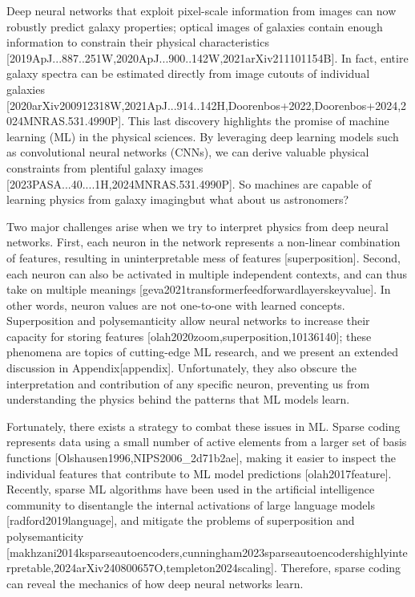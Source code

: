 \documentclass[11pt,a4paper]{article}
\begin{document}
Deep neural networks that exploit pixel-scale information from images can now robustly predict galaxy properties; optical images of galaxies contain enough information to constrain their physical characteristics [2019ApJ...887..251W,2020ApJ...900..142W,2021arXiv211101154B]. In fact, entire galaxy spectra can be estimated directly from image cutouts of individual galaxies [2020arXiv200912318W,2021ApJ...914..142H,Doorenbos+2022,Doorenbos+2024,2024MNRAS.531.4990P]. This last discovery highlights the promise of machine learning (ML) in the physical sciences. By leveraging deep learning models such as convolutional neural networks (CNNs), we can derive valuable physical constraints from plentiful galaxy images [2023PASA...40....1H,2024MNRAS.531.4990P].
So machines are capable of learning physics from galaxy imagingbut what about us astronomers?

Two major challenges arise when we try to interpret physics from deep neural networks. First, each neuron in the network represents a non-linear combination of features, resulting in uninterpretable mess of features [superposition]. Second, each neuron can also be activated in multiple independent contexts, and can thus take on multiple meanings [geva2021transformerfeedforwardlayerskeyvalue]. In other words, neuron values are not one-to-one with learned concepts. Superposition and polysemanticity allow neural networks to increase their capacity for storing features [olah2020zoom,superposition,10136140]; these phenomena are topics of cutting-edge ML research, and we present an extended discussion in Appendix[appendix]. Unfortunately, they also obscure the interpretation and contribution of any specific neuron, preventing us from understanding the physics behind the patterns that ML models learn.

Fortunately, there exists a strategy to combat these issues in ML. Sparse coding represents data using a small number of active elements from a larger set of basis functions [Olshausen1996,NIPS2006\_2d71b2ae], making it easier to inspect the individual features that contribute to ML model predictions [olah2017feature]. Recently, sparse ML algorithms have been used in the artificial intelligence community to disentangle the internal activations of large language models [radford2019language], and mitigate the problems of superposition and polysemanticity [makhzani2014ksparseautoencoders,cunningham2023sparseautoencodershighlyinterpretable,2024arXiv240800657O,templeton2024scaling]. Therefore, sparse coding can reveal the mechanics of how deep neural networks learn.
\end{document}
